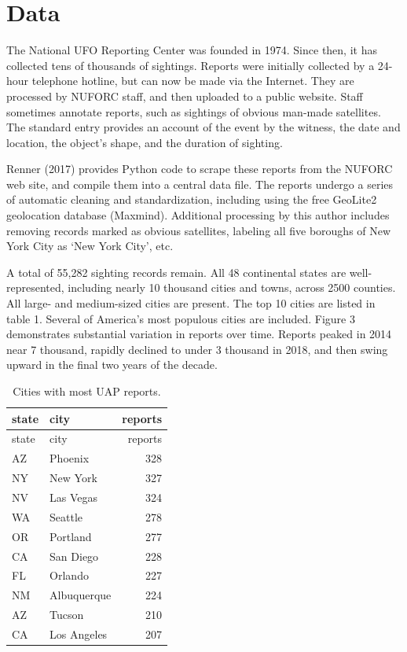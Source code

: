 \documentclass[]{elsarticle} %
\begin{document}
\hypertarget{data}{%
\section{Data}\label{data}}

The National UFO Reporting Center was founded in 1974. Since then, it
has collected tens of thousands of sightings. Reports were initially
collected by a 24-hour telephone hotline, but can now be made via the
Internet. They are processed by NUFORC staff, and then uploaded to a
public website. Staff sometimes annotate reports, such as sightings of
obvious man-made satellites. The standard entry provides an account of
the event by the witness, the date and location, the object's shape, and
the duration of sighting.

Renner (2017) provides Python code to scrape these reports from the
NUFORC web site, and compile them into a central data file. The reports
undergo a series of automatic cleaning and standardization, including
using the free GeoLite2 geolocation database (Maxmind). Additional
processing by this author includes removing records marked as obvious
satellites, labeling all five boroughs of New York City as `New York
City', etc.

A total of 55,282 sighting records remain. All 48 continental states are
well-represented, including nearly 10 thousand cities and towns, across
2500 counties. All large- and medium-sized cities are present. The top
10 cities are listed in table 1. Several of America's most populous
cities are included. Figure 3 demonstrates substantial variation in
reports over time. Reports peaked in 2014 near 7 thousand, rapidly
declined to under 3 thousand in 2018, and then swing upward in the final
two years of the decade.

\begin{longtable}[]{@{}llr@{}}
\caption{Cities with most UAP reports.}\tabularnewline
\toprule
state & city & reports \\
\midrule
\endfirsthead
\toprule
state & city & reports \\
\midrule
\endhead
AZ & Phoenix & 328 \\
NY & New York & 327 \\
NV & Las Vegas & 324 \\
WA & Seattle & 278 \\
OR & Portland & 277 \\
CA & San Diego & 228 \\
FL & Orlando & 227 \\
NM & Albuquerque & 224 \\
AZ & Tucson & 210 \\
CA & Los Angeles & 207 \\
\bottomrule
\end{longtable}
\end{document}
